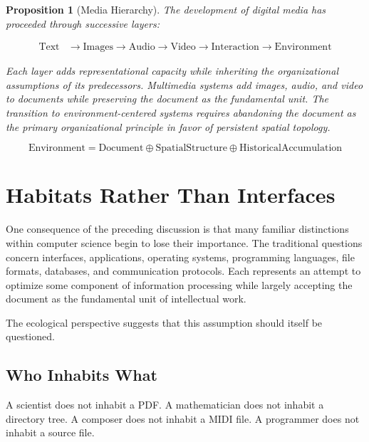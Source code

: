 \documentclass[12pt,oneside]{article}
\newtheorem{proposition}[definition]{Proposition}
\theoremstyle{remark}
\begin{document}
\begin{proposition}[Media Hierarchy]
The development of digital media has proceeded through successive layers:

\begin{align*}
\text{Text} &\to \text{Images} \to \text{Audio} \to \text{Video} \to \text{Interaction} \to \text{Environment}
\end{align*}

Each layer adds representational capacity while inheriting the organizational assumptions of its predecessors. Multimedia systems add images, audio, and video to documents while preserving the document as the fundamental unit. The transition to environment-centered systems requires abandoning the document as the primary organizational principle in favor of persistent spatial topology.

\begin{equation}
\text{Environment} = \text{Document} \oplus \text{SpatialStructure} \oplus \text{HistoricalAccumulation}
\end{equation}
\end{proposition}


\section{Habitats Rather Than Interfaces}

One consequence of the preceding discussion is that many familiar distinctions within computer science begin to lose their importance. The traditional questions concern interfaces, applications, operating systems, programming languages, file formats, databases, and communication protocols. Each represents an attempt to optimize some component of information processing while largely accepting the document as the fundamental unit of intellectual work.

The ecological perspective suggests that this assumption should itself be questioned.

\subsection{Who Inhabits What}

A scientist does not inhabit a PDF.
A mathematician does not inhabit a directory tree.
A composer does not inhabit a MIDI file.
A programmer does not inhabit a source file.
\end{document}

